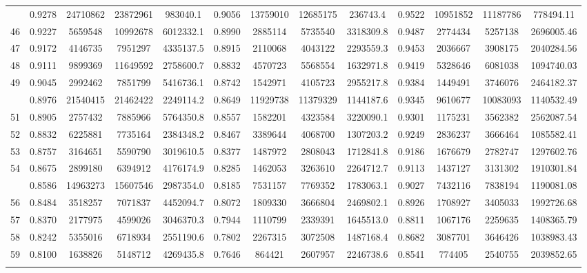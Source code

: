 \documentclass[
  12pt,
]{article}
\begin{document}
\begin{longtable}[t]{lcccccccccccc}
\addlinespace
45 & 0.9278 & 24710862 & 23872961 & 983040.1 & 0.9056 & 13759010 & 12685175 & 236743.4 & 0.9522 & 10951852 & 11187786 & 778494.11\\
46 & 0.9227 & 5659548 & 10992678 & 6012332.1 & 0.8990 & 2885114 & 5735540 & 3318309.8 & 0.9487 & 2774434 & 5257138 & 2696005.46\\
47 & 0.9172 & 4146735 & 7951297 & 4335137.5 & 0.8915 & 2110068 & 4043122 & 2293559.3 & 0.9453 & 2036667 & 3908175 & 2040284.56\\
48 & 0.9111 & 9899369 & 11649592 & 2758600.7 & 0.8832 & 4570723 & 5568554 & 1632971.8 & 0.9419 & 5328646 & 6081038 & 1094740.03\\
49 & 0.9045 & 2992462 & 7851799 & 5416736.1 & 0.8742 & 1542971 & 4105723 & 2955217.8 & 0.9384 & 1449491 & 3746076 & 2464182.37\\
\addlinespace
50 & 0.8976 & 21540415 & 21462422 & 2249114.2 & 0.8649 & 11929738 & 11379329 & 1144187.6 & 0.9345 & 9610677 & 10083093 & 1140532.49\\
51 & 0.8905 & 2757432 & 7885966 & 5764350.8 & 0.8557 & 1582201 & 4323584 & 3220090.1 & 0.9301 & 1175231 & 3562382 & 2562087.54\\
52 & 0.8832 & 6225881 & 7735164 & 2384348.2 & 0.8467 & 3389644 & 4068700 & 1307203.2 & 0.9249 & 2836237 & 3666464 & 1085582.41\\
53 & 0.8757 & 3164651 & 5590790 & 3019610.5 & 0.8377 & 1487972 & 2808043 & 1712841.8 & 0.9186 & 1676679 & 2782747 & 1297602.76\\
54 & 0.8675 & 2899180 & 6394912 & 4176174.9 & 0.8285 & 1462053 & 3263610 & 2264712.7 & 0.9113 & 1437127 & 3131302 & 1910301.84\\
\addlinespace
55 & 0.8586 & 14963273 & 15607546 & 2987354.0 & 0.8185 & 7531157 & 7769352 & 1783063.1 & 0.9027 & 7432116 & 7838194 & 1190081.08\\
56 & 0.8484 & 3518257 & 7071837 & 4452094.7 & 0.8072 & 1809330 & 3666804 & 2469802.1 & 0.8926 & 1708927 & 3405033 & 1992726.68\\
57 & 0.8370 & 2177975 & 4599026 & 3046370.3 & 0.7944 & 1110799 & 2339391 & 1645513.0 & 0.8811 & 1067176 & 2259635 & 1408365.79\\
58 & 0.8242 & 5355016 & 6718934 & 2551190.6 & 0.7802 & 2267315 & 3072508 & 1487168.4 & 0.8682 & 3087701 & 3646426 & 1038983.43\\
59 & 0.8100 & 1638826 & 5148712 & 4269435.8 & 0.7646 & 864421 & 2607957 & 2246738.6 & 0.8541 & 774405 & 2540755 & 2039852.65\\
\addlinespace

\end{longtable}
\end{document}

